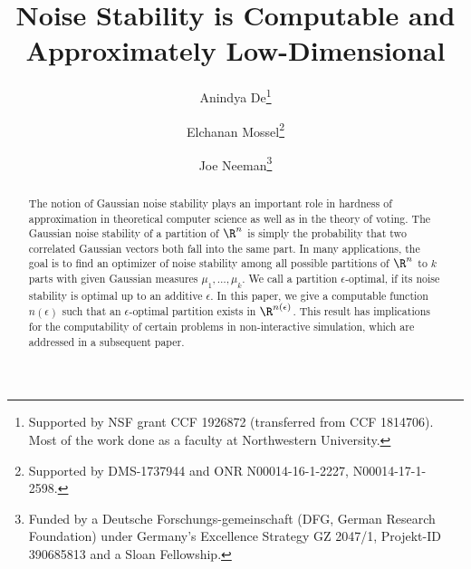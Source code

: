 \documentclass{toc}
\begin{document}
\begin{frontmatter}%
  
%
    \title{Noise Stability is Computable and Approximately Low-Dimensional} %

%
%

%
%
%

%
%
%
%
%
%
%
%
%
%
%
%


%
%
%
%

%

\author[de]{Anindya De\thanks{Supported by NSF grant CCF 1926872 (transferred from CCF 1814706). Most of the work done as a faculty at Northwestern University. }}
\author[mossel]{Elchanan Mossel\thanks{Supported by DMS-1737944 and  ONR N00014-16-1-2227, N00014-17-1-2598. }}
\author[neeman]{Joe Neeman\thanks{Funded by a Deutsche
Forschungs-gemeinschaft (DFG, German Research Foundation) under Germany’s Excellence Strategy
GZ 2047/1, Projekt-ID 390685813 and a Sloan Fellowship.}}

%
%
%
%

%
%
%
%
%
%
\begin{abstract}
    The notion of Gaussian noise stability plays an important role in hardness
    of approximation in theoretical computer science as well as in the theory
    of voting.
    The Gaussian noise stability of a partition of $\R^n$ is simply the probability
    that two correlated Gaussian vectors both fall into the
%
same part. In many   %
applications, the goal is to find an optimizer of noise stability among all possible partitions of $\R^n$  to $k$ parts with given Gaussian measures $\mu_1,\ldots,\mu_k$. We call a partition $\epsilon$-optimal, if its noise stability is optimal up to an additive $\epsilon$.
In this paper, we give a computable function $n(\epsilon)$
such that an $\epsilon$-optimal partition exists in $\R^{n(\epsilon)}$.
This result has implications for the computability of certain problems
in non-interactive simulation, which are addressed in a subsequent
%
%
paper.  %
\end{abstract}

%

\end{frontmatter}
\end{document}
